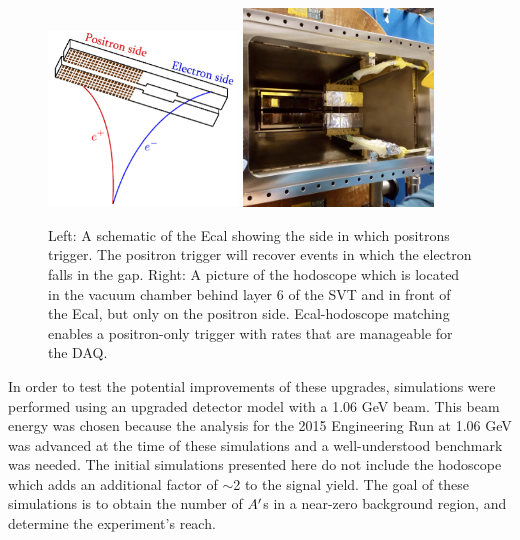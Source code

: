 \begin{figure}
    \centering
    \includegraphics[width=0.45\textwidth]{figs/upgrades/positron_trigger.png}
    \includegraphics[width=0.45\textwidth]{figs/upgrades/Hodo_2.jpeg}
    \caption{Left: A schematic of the Ecal showing the side in which positrons trigger. The positron trigger will recover events in which the electron falls in the gap. Right: A picture of the hodoscope which is located in the vacuum chamber behind layer 6 of the SVT and in front of the Ecal, but only on the positron side. Ecal-hodoscope matching enables a positron-only trigger with rates that are manageable for the DAQ.}
    \label{fig:positrigger}
\end{figure}

In order to test the potential improvements of these upgrades, simulations were performed using an upgraded detector model with a 1.06 GeV beam. This beam energy was chosen because the analysis for the 2015 Engineering Run at 1.06 GeV was advanced at the time of these simulations and a well-understood benchmark was needed. The initial simulations presented here do not include the hodoscope which adds an additional factor of $\sim$2 to the signal yield. The goal of these simulations is to obtain the number of $A^\prime$s in a near-zero background region, and determine the experiment's reach. %


